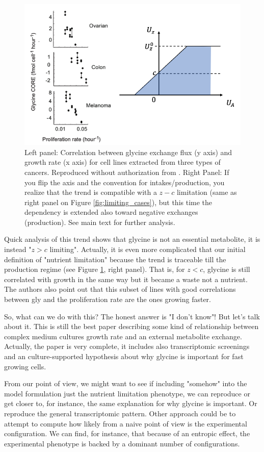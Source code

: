\documentclass[
10pt, %
a4paper, %
oneside, %
headinclude,footinclude, %
BCOR5mm, %
]{scrartcl}
\begin{document}
\begin{figure}[h]
\centering
\includegraphics[width=0.8\columnwidth]{images/gly_cancer_corr.png}
\caption[]{
Left panel: Correlation between glycine exchange flux (y axis) and growth rate (x axis) for
cell lines extracted from three types of cancers. Reproduced without authorization from \cite{jainMetaboliteProfilingIdentifies2012}.
Right Panel: If you flip the axis and the convention for intakes/production, you realize that the trend is
compatible with a $z - c$ limitation (same as right panel on Figure \ref{fig:limiting_cases}), but this time the dependency is extended
also toward negative exchanges (production).
See main text for further analysis.
}
\label{fig:gly_cancer_corr}
\end{figure}

Quick analysis of this trend shows that glycine is not an essential metabolite, it is instead "$z > c$ limiting".
Actually, it is even more complicated that our initial definition of "nutrient limitation" because the trend is traceable till the production regime
(see Figure \ref{fig:gly_cancer_corr}, right panel).
That is, for $z < c$, glycine is still correlated with growth in the same way but it became a waste not a nutrient.
The authors also point out that this subset of lines with good correlations between gly and the proliferation rate are the ones growing
faster.

So, what can we do with this? The honest answer is "I don't know"! But let's talk about it.
This is still the best paper describing some kind of relationship between complex medium cultures growth rate and an external metabolite exchange.
Actually, the paper is very complete, it includes also transcriptomic screenings and an culture-supported hypothesis about why
glycine is important for fast growing cells.

From our point of view, we might want to see if including "somehow" into the model formulation just the nutrient limitation phenotype, we can
reproduce or get closer to, for instance, the same explanation for why glycine is important.
Or reproduce the general transcriptomic pattern.
Other approach could be to attempt to compute how likely from a naive point of view is the experimental configuration.
We can find, for instance, that because of an entropic effect, the experimental phenotype is backed by a dominant number of configurations.
\end{document}
